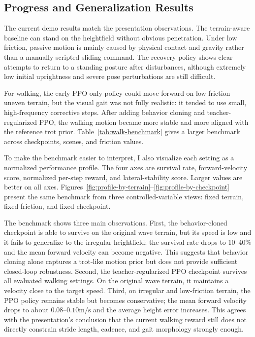\documentclass[conference]{IEEEtran}
\begin{document}
\subsection{Progress and Generalization Results}
The current demo results match the presentation observations. The terrain-aware baseline can stand on the heightfield without obvious penetration. Under low friction, passive motion is mainly caused by physical contact and gravity rather than a manually scripted sliding command. The recovery policy shows clear attempts to return to a standing posture after disturbances, although extremely low initial uprightness and severe pose perturbations are still difficult.

For walking, the early PPO-only policy could move forward on low-friction uneven terrain, but the visual gait was not fully realistic: it tended to use small, high-frequency corrective steps. After adding behavior cloning and teacher-regularized PPO, the walking motion became more stable and more aligned with the reference trot prior. Table~\ref{tab:walk-benchmark} gives a larger benchmark across checkpoints, scenes, and friction values.

To make the benchmark easier to interpret, I also visualize each setting as a normalized performance profile. The four axes are survival rate, forward-velocity score, normalized per-step reward, and lateral-stability score. Larger values are better on all axes. Figures~\ref{fig:profile-by-terrain}--\ref{fig:profile-by-checkpoint} present the same benchmark from three controlled-variable views: fixed terrain, fixed friction, and fixed checkpoint.


The benchmark shows three main observations. First, the behavior-cloned checkpoint is able to survive on the original wave terrain, but its speed is low and it fails to generalize to the irregular heightfield: the survival rate drops to 10--40\% and the mean forward velocity can become negative. This suggests that behavior cloning alone captures a trot-like motion prior but does not provide sufficient closed-loop robustness. Second, the teacher-regularized PPO checkpoint survives all evaluated walking settings. On the original wave terrain, it maintains a velocity close to the target speed. Third, on irregular and low-friction terrain, the PPO policy remains stable but becomes conservative; the mean forward velocity drops to about $0.08$--$0.10\mathrm{m/s}$ and the average height error increases. This agrees with the presentation's conclusion that the current walking reward still does not directly constrain stride length, cadence, and gait morphology strongly enough.
\end{document}
